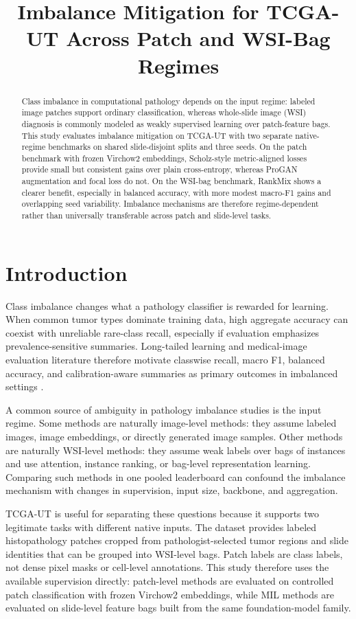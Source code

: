 \documentclass[11pt]{article}
\title{Imbalance Mitigation for TCGA-UT Across Patch and WSI-Bag Regimes}
\author{}
\date{}
\begin{document}
\maketitle

\begin{abstract}
\noindent Class imbalance in computational pathology depends on the input regime: labeled image patches support ordinary classification, whereas whole-slide image (WSI) diagnosis is commonly modeled as weakly supervised learning over patch-feature bags. This study evaluates imbalance mitigation on TCGA-UT with two separate native-regime benchmarks on shared slide-disjoint splits and three seeds. On the patch benchmark with frozen Virchow2 embeddings, Scholz-style metric-aligned losses provide small but consistent gains over plain cross-entropy, whereas ProGAN augmentation and focal loss do not. On the WSI-bag benchmark, RankMix shows a clearer benefit, especially in balanced accuracy, with more modest macro-F1 gains and overlapping seed variability. Imbalance mechanisms are therefore regime-dependent rather than universally transferable across patch and slide-level tasks.
\end{abstract}

\section{Introduction}
Class imbalance changes what a pathology classifier is rewarded for learning. When common tumor types dominate training data, high aggregate accuracy can coexist with unreliable rare-class recall, especially if evaluation emphasizes prevalence-sensitive summaries. Long-tailed learning and medical-image evaluation literature therefore motivate classwise recall, macro F1, balanced accuracy, and calibration-aware summaries as primary outcomes in imbalanced settings \citep{saini2023tacklingClass,zhang2023deepLong,mosquera2024classImbalance}.

A common source of ambiguity in pathology imbalance studies is the input regime. Some methods are naturally image-level methods: they assume labeled images, image embeddings, or directly generated image samples. Other methods are naturally WSI-level methods: they assume weak labels over bags of instances and use attention, instance ranking, or bag-level representation learning. Comparing such methods in one pooled leaderboard can confound the imbalance mechanism with changes in supervision, input size, backbone, and aggregation.

TCGA-UT is useful for separating these questions because it supports two legitimate tasks with different native inputs. The dataset provides labeled histopathology patches cropped from pathologist-selected tumor regions and slide identities that can be grouped into WSI-level bags. Patch labels are class labels, not dense pixel masks or cell-level annotations. This study therefore uses the available supervision directly: patch-level methods are evaluated on controlled patch classification with frozen Virchow2 embeddings, while MIL methods are evaluated on slide-level feature bags built from the same foundation-model family.
\end{document}
